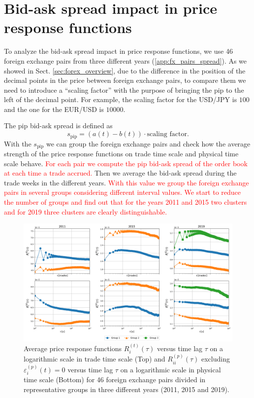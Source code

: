 \section{Bid-ask spread impact in price response functions}
\label{sec:spread_impact}

To analyze the bid-ask spread impact in price response functions, we use 46
foreign exchange pairs from three different years (\ref{app:fx_pairs_spread}).
As we showed in Sect. \ref{sec:forex_overview}, due to the difference in the
position of the decimal points in the price between foreign exchange pairs, to
compare them we need to introduce a ``scaling factor'' with the purpose of
bringing the pip to the left of the decimal point. For example, the scaling
factor for the USD/JPY is $100$ and the one for the EUR/USD is $10000$.

The pip bid-ask spread is defined as \cite{micro_eff}
\begin{equation}
    s_{\textrm{pip}} = \left(a\left(t\right) - b\left(t\right)\right) \cdot
    \textrm{scaling factor}.
\end{equation}
With the $s_{\textrm{pip}}$ we can group the foreign exchange pairs and check
how the average strength of the price response functions on trade time scale
and physical time scale behave. \textcolor{red}{For each pair we compute the pip bid-ask spread
of the order book at each time a trade accrued.} Then we average the bid-ask spread during
the trade weeks in the different years. \textcolor{red}{With this value we group the foreign
exchange pairs in several groups considering different interval values. We start to reduce
the number of groups and find out that for the years 2011 and 2015 two clusters and for 2019
three clusters are clearly distinguishable.}

\begin{figure}[htbp]
    \centering
    \includegraphics[width=\textwidth]{figures/05_spread_impact.png}
    \caption{Average price response functions
             $R^{\left(t\right)}_{i}\left(\tau\right)$ versus time lag $\tau$
             on a logarithmic scale in trade time scale (Top) and
             $R^{\left(p\right)}_{ii}\left(\tau\right)$ excluding
             $\varepsilon^{\left(p\right)}_{i}\left(t\right) = 0$ versus time
             lag $\tau$ on a logarithmic scale in physical time scale (Bottom)
             for 46 foreign exchange pairs divided in representative groups in
             three different years (2011, 2015 and 2019).}
    \label{fig:spread_impact}
\end{figure}

